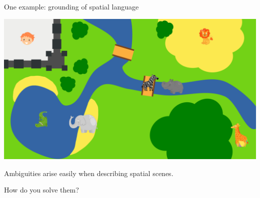 \documentclass[compress]{beamer}
\begin{document}
\begin{frame}{One example: grounding of spatial language}


    \begin{center}
        \includegraphics[width=0.9\linewidth]{ambiguous-desc/RefMap}
    \end{center}

    Ambiguities arise easily when describing spatial scenes.

    How do you solve them?

\end{frame}




\end{document}

